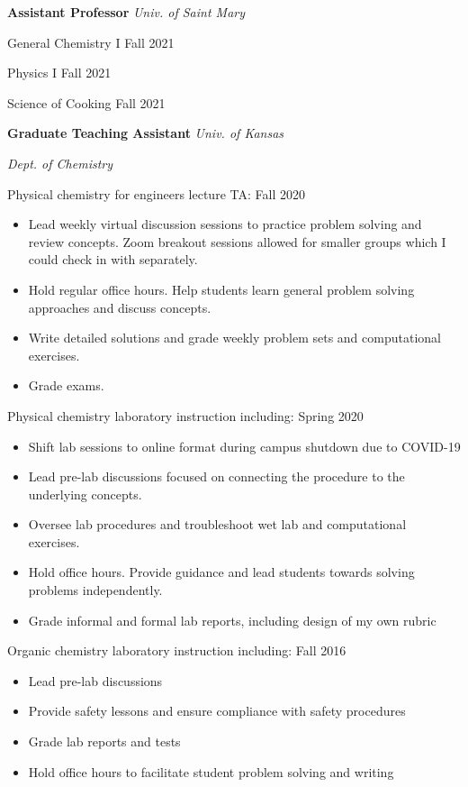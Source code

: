 {\bf Assistant Professor} \hfill \textit{Univ. of Saint Mary}

General Chemistry I \hfill Fall 2021

Physics I \hfill Fall 2021

Science of Cooking \hfill Fall 2021

\vspace{\y}

{\bf Graduate Teaching Assistant} \hfill \textit{Univ. of Kansas}

\hfill \textit{Dept. of Chemistry}

Physical chemistry for engineers lecture TA: \hfill Fall 2020
\begin{itemize}[rightmargin=\dimexpr\linewidth-10cm-\leftmargin\relax,noitemsep,topsep=0cm]
\raggedright
  \item Lead weekly virtual discussion sessions to practice problem solving and review concepts. Zoom breakout sessions allowed for smaller groups which I could check in with separately.
  \item Hold regular office hours. Help students learn general problem solving approaches and discuss concepts.
  \item Write detailed solutions and grade weekly problem sets and computational exercises.
  \item Grade exams.
\end{itemize}

\vspace{\y}
Physical chemistry laboratory instruction including: \hfill Spring 2020
\begin{itemize}[rightmargin=\dimexpr\linewidth-10cm-\leftmargin\relax,noitemsep,topsep=0cm]
\raggedright
  \item Shift lab sessions to online format during campus shutdown due to COVID-19
  \item Lead pre-lab discussions focused on connecting the procedure to the underlying concepts.
  \item Oversee lab procedures and troubleshoot wet lab and computational
  exercises.
  \item Hold office hours. Provide guidance and lead students towards solving problems independently.
  \item Grade informal and formal lab reports, including design of my own rubric
\end{itemize}

\vspace{\y}
Organic chemistry laboratory instruction including: \hfill Fall 2016
\begin{itemize}[rightmargin=\dimexpr\linewidth-10cm-\leftmargin\relax,noitemsep,topsep=0cm]
\raggedright
  \item Lead pre-lab discussions
  \item Provide safety lessons and ensure compliance with safety procedures
  \item Grade lab reports and tests
  \item Hold office hours to facilitate student problem solving and writing
\end{itemize}


